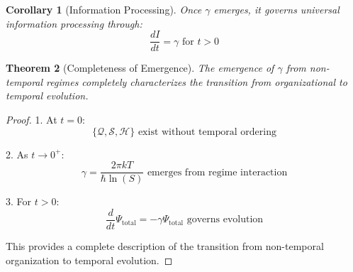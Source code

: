 \documentclass{article}
\newtheorem{theorem}{Theorem}
\newtheorem{corollary}[theorem]{Corollary}
\begin{document}
\begin{corollary}[Information Processing]
Once $\gamma$ emerges, it governs universal information processing through:
\begin{equation}
\frac{dI}{dt} = \gamma \text{ for } t > 0
\end{equation}
\end{corollary}

\begin{theorem}[Completeness of Emergence]
The emergence of $\gamma$ from non-temporal regimes completely characterizes the transition from organizational to temporal evolution.
\end{theorem}

\begin{proof}
1. At $t = 0$:
   \begin{equation}
   \{\mathcal{Q}, \mathcal{S}, \mathcal{H}\} \text{ exist without temporal ordering}
   \end{equation}

2. As $t \to 0^{+}$:
   \begin{equation}
   \gamma = \frac{2\pi kT}{\hbar \ln(S)} \text{ emerges from regime interaction}
   \end{equation}

3. For $t > 0$:
   \begin{equation}
   \frac{d}{dt}\Psi_{\text{total}} = -\gamma\Psi_{\text{total}} \text{ governs evolution}
   \end{equation}

This provides a complete description of the transition from non-temporal organization to temporal evolution.
\end{proof}
\end{document}
